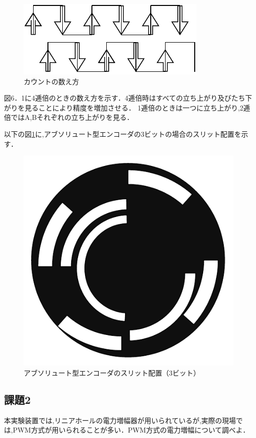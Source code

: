 \begin{figure}[h]
  \centering
  \includegraphics[scale=0.8]{sozai/11.pdf}
  \caption{カウントの数え方}
\end{figure}

図6．1に4逓倍のときの数え方を示す．4逓倍時はすべての立ち上がり及びたち下がりを見ることにより精度を増加させる．
1逓倍のときは一つに立ち上がり,2逓倍ではA,Bそれぞれの立ち上がりを見る．

以下の図\ref{fig:abs_encoder}に,アブソリュート型エンコーダの3ビットの場合のスリット配置を示す．
\begin{figure}[h]
  \centering
  \includegraphics[scale=0.5]{sozai/10.pdf}
  \caption{アブソリュート型エンコーダのスリット配置（3ビット）}
  \label{fig:abs_encoder}
\end{figure}



\subsection*{課題2}
本実験装置では,リニアホールの電力増幅器が用いられているが,実際の現場では,PWM方式が用いられることが多い．PWM方式の電力増幅について調べよ．

